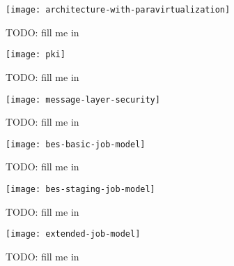\begin{figure}
  \begin{center}
    \texttt{[image: architecture-with-paravirtualization]}
  \end{center}
  \caption[Para-Virtualization architecture]{TODO: fill me in}
  \label{fig:arch-para-virt}
\end{figure}

\begin{figure}
  \begin{center}
    \texttt{[image: pki]}
  \end{center}
  \caption[Public Key Infrastructure]{TODO: fill me in}
  \label{fig:net-pki}
\end{figure}

\begin{figure}
  \begin{center}
    \texttt{[image: message-layer-security]}
  \end{center}
  \caption[Message Layer Security]{TODO: fill me in}
  \label{fig:net-mls}
\end{figure}

\begin{figure}
  \begin{center}
    \texttt{[image: bes-basic-job-model]}
  \end{center}
  \caption[BES Basic State Model]{TODO: fill me in}
  \label{fig:bes-basic}
\end{figure}

\begin{figure}
  \begin{center}
    \texttt{[image: bes-staging-job-model]}
  \end{center}
  \caption[BES State Model Staging Extension]{TODO: fill me in}
  \label{fig:bes-staging}
\end{figure}

\begin{figure}
  \begin{center}
    \texttt{[image: extended-job-model]}
  \end{center}
  \caption[Job Model (extended)]{TODO: fill me in}
  \label{fig:bes-extended}
\end{figure}

